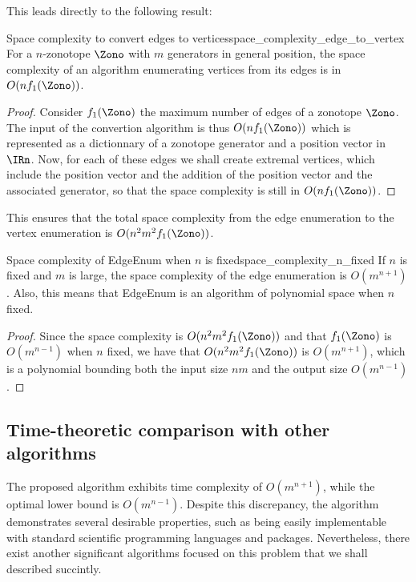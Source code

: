 This leads directly to the following result:
\begin{theorembox}{Space complexity to convert edges to vertices}{space_complexity_edge_to_vertex}
    For a $n$-zonotope $\Zono$ with $m$ generators in general position, the space complexity of an algorithm enumerating vertices from its edges is in $O(nf_1(\Zono))$.
\end{theorembox}
\begin{proof}
    Consider $f_1(\Zono)$ the maximum number of edges of a zonotope $\Zono$. The input of the convertion algorithm is thus $O(nf_1(\Zono))$ which is represented as a dictionnary of a zonotope generator and a position vector in $\IRn$. Now, for each of these edges we shall create extremal vertices, which include the position vector and the addition of the position vector and the associated generator, so that the space complexity is still in $O(nf_1(\Zono))$.
\end{proof}
This ensures that the total space complexity from the edge enumeration to the vertex enumeration is $O(n^2m^2f_1(\Zono))$.

\begin{theorembox}{Space complexity of EdgeEnum when $n$ is fixed}{space_complexity_n_fixed}
    If $n$ is fixed and $m$ is large, the space complexity of the edge enumeration is $O\left( m^{n+1} \right)$. Also, this means that EdgeEnum is an algorithm of polynomial space when $n$ fixed.
\end{theorembox}
\begin{proof}
    Since the space complexity is $O(n^2m^2f_1(\Zono))$ and that $f_1(\Zono)$ is $O(m^{n-1})$ when $n$ fixed, we have that $O(n^2m^2f_1(\Zono))$ is $O(m^{n+1})$, which is a polynomial bounding both the input size $nm$ and the output size $O(m^{n-1})$.
\end{proof}


\subsection{Time-theoretic comparison with other algorithms}
The proposed algorithm exhibits time complexity of $O(m^{n+1})$, while the optimal lower bound is $O(m^{n-1})$. Despite this discrepancy, the algorithm demonstrates several desirable properties, such as being easily implementable with standard scientific programming languages and packages. Nevertheless, there exist another significant algorithms focused on this problem that we shall described succintly.

